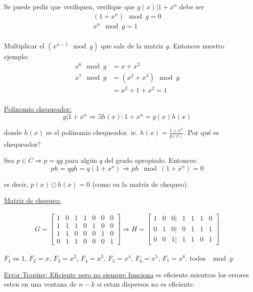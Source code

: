 \documentclass[12pt,a4paper]{article}
\begin{document}
Se puede pedir que verifiquen, verifique que $g(x)|1+x^{n}$ debe ser 
\begin{align*}
    (1+x^{n}) \mod g = 0\\
    x^{n} \mod g = 1\\
\end{align*}

Multiplicar el $(x^{n-1} \mod g)$ que sale de la matriz $g$. Entonces nuestro ejemplo:
\begin{align*}
    x^{6} \mod g &= x + x^{2}\\
    x^{7} \mod g &= (x^{2} + x^{3}) \mod g\\
    &= x^{2} + 1 + x^{2} = 1\\
\end{align*}

\underline{Polinomio chequeador:}
$$g|1+x^{n} \Rightarrow \exists h(x): 1+x^{n} = g(x)h(x)$$

donde $h(x)$ es el polinomio chequeador. ie. $h(x) = \frac{1+x^{n}}{g(x)}$. Por qué es chequeador?
\medskip

Sea $p\in C \Rightarrow p = qg$ para algún $q$ del grado apropiado. Entonces:
$$ph = qgh = q(1+x^{n}) \Rightarrow ph \mod (1+x^{n}) = 0$$

es decir, $p(x) \odot h(x) = 0$ (como en la matriz de chequeo).
\medskip

\underline{Matriz de chequeo:}
\medskip

\begin{eqnarray*}
    G =
    \begin{bmatrix}
        1 & 0 & 1 & 1 & 0 & 0 & 0\\
        1 & 1 & 1 & 0 & 1 & 0 & 0\\
        1 & 1 & 0 & 0 & 0 & 1 & 0\\
        0 & 1 & 1 & 0 & 0 & 0 & 1
    \end{bmatrix}
    \Rightarrow
    H =
    \begin{bmatrix}
        1 & 0 & 0 | & 1 & 1 & 1 & 0\\
        0 & 1 & 0 | & 0 & 1 & 1 & 1\\
        0 & 0 & 1 | & 1 & 1 & 0 & 1
    \end{bmatrix}
\end{eqnarray*}

$F_{1}$ es $1$, $F_{2} = x$, $F_{3} = x^{2}$, $F_{4} = x^{3}$, $F_{5} = x^{4}$, $F_{6} = x^{5}$, $F_{7} = x^{6}$.
todos $\mod g$.
\medskip

\underline{Error Traping: Eficiente pero no siempre funciona}
\medskip
es eficiente mientras los errores esten en una ventana de $n-k$ si estan dispersos 
no es eficiente.
\medskip
\end{document}
